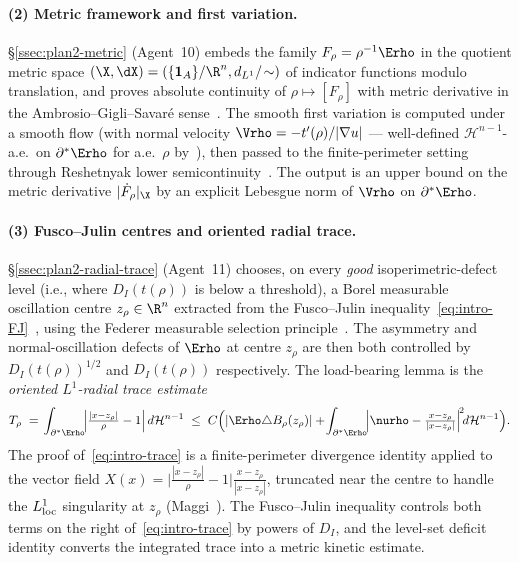 \paragraph{(2) Metric framework and first variation.}
\S\ref{ssec:plan2-metric} (Agent~10) embeds the family
$F_\rho=\rho^{-1}\Erho$ in the quotient metric space
$(\X,\dX)=(\{\mathbf 1_A\}/\R^n, d_{L^1}/\!\sim)$ of indicator
functions modulo translation, and proves absolute continuity of
$\rho\mapsto[F_\rho]$ with metric derivative in the
Ambrosio--Gigli--Savar\'e sense~\cite[Def.~1.1.1, Thm~1.1.2]{AGS2008}.
The smooth first variation is computed under a smooth flow (with
normal velocity $\Vrho=-t'(\rho)/|\nabla u|$ ---
well-defined $\mathcal H^{n-1}$-a.e.\ on $\partial^*\Erho$ for a.e.\
$\rho$ by~\cite[Thm~A.1]{FigalliMaggi2011}), then passed to the
finite-perimeter setting through Reshetnyak lower
semicontinuity~\cite[Thm~2.38]{AFP2000}. The output is an upper bound
on the metric derivative $|\dot F_\rho|_\X$ by an explicit Lebesgue
norm of $\Vrho$ on $\partial^*\Erho$.

\paragraph{(3) Fusco--Julin centres and oriented radial trace.}
\S\ref{ssec:plan2-radial-trace} (Agent~11) chooses, on every \emph{good}
isoperimetric-defect level (i.e., where $D_I(t(\rho))$ is below a
threshold), a Borel measurable oscillation centre $z_\rho\in\R^n$
extracted from the Fusco--Julin
inequality~\eqref{eq:intro-FJ}~\cite{FJ2014}, using the
Federer measurable selection
principle~\cite[\S2.13]{Federer1969}. The asymmetry and
normal-oscillation defects of $\Erho$ at centre $z_\rho$ are then
both controlled by $D_I(t(\rho))^{1/2}$ and $D_I(t(\rho))$
respectively. The load-bearing lemma is the \emph{oriented
$L^1$-radial trace estimate}
\begin{equation}\label{eq:intro-trace}
   T_\rho
   \;=\;\!\int_{\partial^*\Erho}\!
      \Bigl|\tfrac{|x-z_\rho|}{\rho}-1\Bigr|\,d\mathcal H^{n-1}
   \;\le\;C\Bigl(
      |\Erho\triangle B_\rho(z_\rho)|
      +\!\int_{\partial^*\Erho}\!
         \Bigl|\nurho-\tfrac{x-z_\rho}{|x-z_\rho|}\Bigr|^{\!2}\!
         d\mathcal H^{n-1}
   \Bigr).
\end{equation}
The proof of~\eqref{eq:intro-trace} is a finite-perimeter divergence
identity applied to the vector field
$X(x)=\bigl|\tfrac{|x-z_\rho|}{\rho}-1\bigr|\tfrac{x-z_\rho}{|x-z_\rho|}$,
truncated near the centre to handle the $L^1_{\rm loc}$ singularity at
$z_\rho$ (Maggi~\cite[Thm~16.3]{Maggi2012}). The Fusco--Julin
inequality controls both terms on the right of~\eqref{eq:intro-trace}
by powers of $D_I$, and the level-set deficit identity converts the
integrated trace into a metric kinetic estimate.

